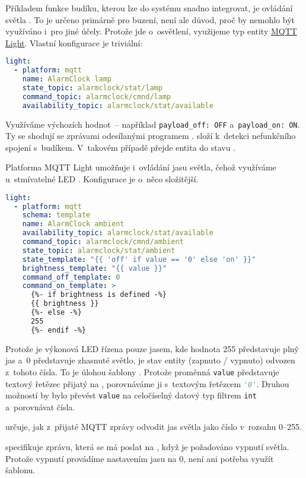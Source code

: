 Příkladem funkce budíku, kterou lze do systému snadno integrovat, je ovládání
světla . To je určeno primárně pro buzení, není ale důvod, proč by
nemohlo být využíváno i~pro jiné účely. Protože jde o~osvětlení, využijeme typ
entity
\href{https://www.home-assistant.io/integrations/light.mqtt}{MQTT Light}.
Vlastní konfigurace je triviální:
\begin{lstlisting}[language=yaml]
light:
  - platform: mqtt
    name: AlarmClock lamp
    state_topic: alarmclock/stat/lamp
    command_topic: alarmclock/cmnd/lamp
    availability_topic: alarmclock/stat/available
\end{lstlisting}
Využíváme výchozích hodnot~-- například \lstinline!payload_off: OFF!
a~\lstinline!payload_on: ON!. Ty se shodují se zprávami odesílanými programem
.  složí k~detekci
nefunkčního spojení s~budíkem. V~takovém případě přejde entita
do stavu .

Platforma \foreignlanguage{english}{MQTT Light} umožňuje i~ovládání jasu
světla, čehož využíváme u~stmívatelné LED . Konfigurace je
o~něco složitější.
\begin{lstlisting}[language=yaml]
light:
  - platform: mqtt
    schema: template
    name: AlarmClock ambient
    availability_topic: alarmclock/stat/available
    command_topic: alarmclock/cmnd/ambient
    state_topic: alarmclock/stat/ambient
    state_template: "{{ 'off' if value == '0' else 'on' }}"
    brightness_template: "{{ value }}"
    command_off_template: 0
    command_on_template: >
      {%- if brightness is defined -%}
      {{ brightness }}
      {%- else -%}
      255
      {%- endif -%}
\end{lstlisting}
Protože je výkonová LED řízena pouze jasem, kde hodnota \num{255} představuje
plný jas a~\num{0} představuje zhasnuté světlo, je stav entity (zapnuto /
vypnuto) odvozen z~tohoto čísla. To je úlohou šablony .
Protože proměnná \texttt{value} představuje textový řetězec přijatý na
, porovnáváme ji s~textovým řetězcem
\lstinline[language=Python]!'0'!. Druhou možností by bylo převést
\texttt{value} na celočíselný datový typ filtrem \texttt{int} a~porovnávat
čísla.

 určuje, jak z~přijaté MQTT zprávy odvodit jas
světla jako číslo v~rozsahu \numrange{0}{255}.

 specifikuje zprávu, která se má poslat na
, když je požadováno vypnutí světla. Protože vypnutí
provádíme nastavením jasu na \num{0}, není ani potřeba využít šablonu.

